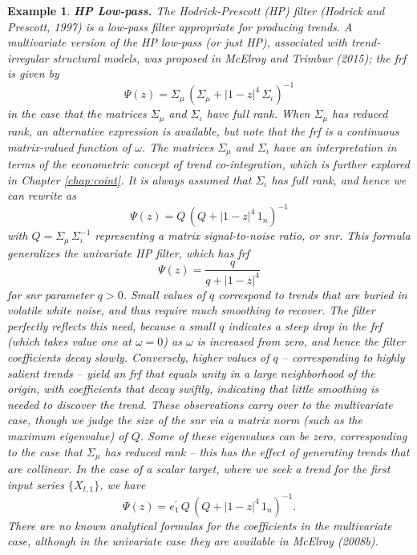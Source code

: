 \documentclass[a4paper]{book}
\newtheorem{Example}{Example}
\begin{document}
\begin{Example} {\bf HP Low-pass.} \rm
\label{exam:hp-low}
 The Hodrick-Prescott (HP) filter (Hodrick
and Prescott, 1997) is a low-pass filter appropriate for producing trends.
 A multivariate version of the HP low-pass (or just HP), 
 associated with trend-irregular structural models,
 was proposed in McElroy and Trimbur (2015); the frf is given by
\[
   \Psi (z) = \Sigma_{\mu} \, { \left( \Sigma_{\mu} + {|1 - z|}^4 \, \Sigma_{\iota} 
	\right) }^{-1}
\]
 in the case that the matrices $\Sigma_{\mu}$ and $\Sigma_{\iota}$ have full rank.  
  When $\Sigma_{\mu}$ has reduced rank, an alternative expression is available,
 but note that the frf is a continuous matrix-valued function of $\omega$.
The matrices $\Sigma_{\mu}$ and $\Sigma_{\iota}$ have an interpretation in terms
 of the econometric concept of trend co-integration, which is further explored
 in Chapter \ref{chap:coint}.  It is always assumed that $\Sigma_{\iota}$ has full rank, 
 and hence  we can rewrite as
\[
  \Psi (z) = Q \, { \left( Q + {| 1 - z|}^4 \, 1_n \right) }^{-1}
\]
 with $Q = \Sigma_{\mu} \, \Sigma_{\iota}^{-1}$ representing a matrix
 {\em signal-to-noise ratio}, or snr.  This formula 
  generalizes the univariate HP filter, which has frf
\[
 \Psi (z) = \frac{ q}{ q + {| 1 - z|}^4 }
\]
 for snr parameter $q > 0$.  Small values of $q$ correspond to trends that are
 buried in volatile white noise, and thus require much smoothing to recover.
 The filter perfectly reflects this need, because a small $q$ indicates a steep
 drop in the frf (which takes value one at $\omega = 0$) as $\omega$ is increased
 from zero, and hence the filter coefficients decay slowly.  Conversely, higher values
 of $q$ -- corresponding to highly salient trends -- yield an frf that equals unity
 in a large neighborhood of the origin, with coefficients that decay swiftly,
 indicating that little smoothing is needed to discover the trend.  These observations
 carry over to the multivariate case, though we judge the size of the snr via a
 matrix norm (such as the maximum eigenvalue) of $Q$.  Some of these eigenvalues can be
 zero, corresponding to the case that $\Sigma_{\mu}$ has reduced rank -- this has the
 effect of generating trends that are collinear.  In the case of a scalar target,
 where we seek a trend for the first input series $\{ X_{t,1} \}$,  we have 
\begin{equation}
\label{eq:hp.mvar-def}
  \Psi (z) = e_1^{\prime} \, Q \, { \left( Q + {| 1 - z|}^4 \, 1_n \right) }^{-1}.
\end{equation}
 There are no known analytical formulas for the coefficients in the multivariate case,
 although in the univariate case they are available in McElroy (2008b).
\end{Example}
\end{document}
